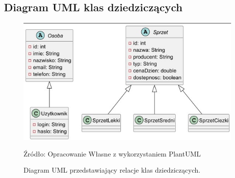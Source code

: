 \subsection{Diagram UML klas dziedziczących}
\begin{figure}[H]
    \centering
    \includegraphics[width=\linewidth]{figures/dziedziczenie.jpg}
    \caption{Diagram UML przedstawiający relacje klas dziedziczących.}
    \label{fig:diagramDziedziczacych_uml}
    \small{Źródło: Opracowanie Własne z wykorzystaniem PlantUML}
\end{figure}
\clearpage


